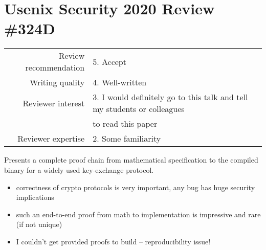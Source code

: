 \newpage
\section{Usenix Security 2020 Review \#324D}

\begin{tabular}{rl}
    \toprule
    Review recommendation & 5. Accept                                                                \\
    Writing quality       & 4. Well-written                                                          \\
    Reviewer interest     & 3. I would definitely go to this talk and tell my students or colleagues \\
                          & to read this paper                                                       \\
    Reviewer expertise    & 2. Some familiarity                                                      \\
    \bottomrule
\end{tabular}

\begin{center}
\end{center}
Presents a complete proof chain from mathematical specification to the compiled binary for a widely used key-exchange protocol.

\begin{center}
\end{center}

\begin{itemize}
    \item correctness of crypto protocols is very important, any bug has huge security implications
    \item such an end-to-end proof from math to implementation is impressive and rare (if not unique)
\end{itemize}


\begin{center}
\end{center}

\begin{itemize}
    \item I couldn't get provided proofs to build – reproducibility issue!
\end{itemize}

\begin{center}
\end{center}

